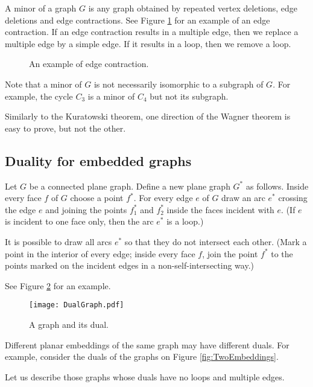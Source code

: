 \begin{page}
\setcounter{section}{3}
\setcounter{subsection}{4}
\setcounter{dfn}{11}
\label{portion:356}


A minor of a graph $G$ is any graph obtained by repeated vertex deletions, edge deletions and edge contractions.
See Figure \ref{fig:K5Contraction} for an example of an edge contraction.
If an edge contraction results in a multiple edge, then we replace a multiple edge by a simple edge.
If it results in a loop, then we remove a loop.

\begin{figure}[ht]
\begin{center}

\end{center}
\caption{An example of edge contraction.}
\label{fig:K5Contraction}
\end{figure}

Note that a minor of $G$ is not necessarily isomorphic to a subgraph of $G$.
For example, the cycle $C_3$ is a minor of $C_4$ but not its subgraph.

Similarly to the Kuratowski theorem, one direction of the Wagner theorem is easy to prove, but not the other.




\end{page}

\begin{page}
\setcounter{section}{3}
\setcounter{subsection}{4}
\setcounter{dfn}{11}
\label{portion:358}

\subsection{Duality for embedded graphs}
Let $G$ be a connected plane graph.
Define a new plane graph $G^*$ as follows.
Inside every face $f$ of $G$ choose a point $f^*$.
For every edge $e$ of $G$ draw an arc $e^*$ crossing the edge $e$ and joining the points $f_1^*$ and $f_2^*$ inside the faces incident with $e$.
(If $e$ is incident to one face only, then the arc $e^*$ is a loop.)

It is possible to draw all arcs $e^*$ so that they do not intersect each other.
(Mark a point in the interior of every edge;
inside every face $f$, join the point $f^*$ to the points marked on the incident edges in a non-self-intersecting way.)

See Figure \ref{fig:DualGraph} for an example.

\begin{figure}[ht]
\begin{center}
\texttt{[image: DualGraph.pdf]}
\end{center}
\caption{A graph and its dual.}
\label{fig:DualGraph}
\end{figure}

Different planar embeddings of the same graph may have different duals.
For example, consider the duals of the graphs on Figure \ref{fig:TwoEmbeddings}.

Let us describe those graphs whose duals have no loops and multiple edges.


\end{page}

